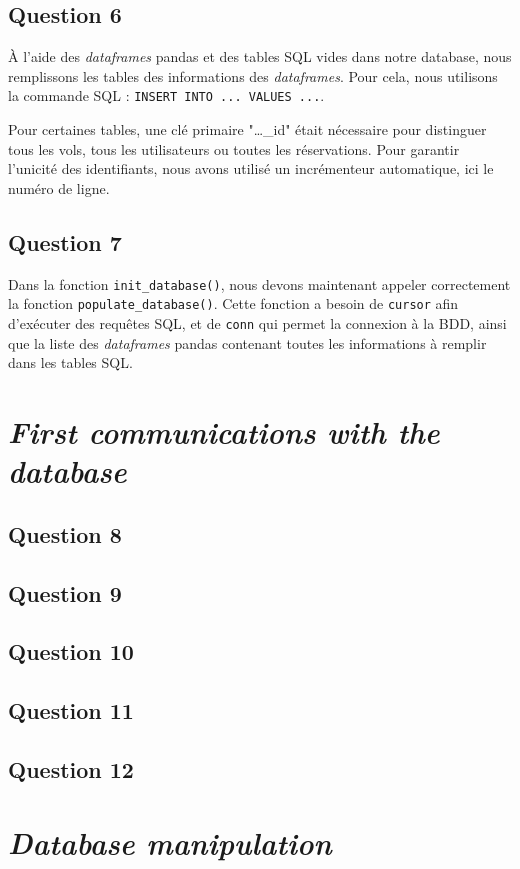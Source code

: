 \documentclass{ceri/sty/rapport}
\begin{document}
\subsection{Question 6}
À l'aide des \textit{dataframes} pandas et des tables SQL vides dans notre database, nous remplissons les tables des informations des \textit{dataframes}.
Pour cela, nous utilisons la commande SQL : \texttt{INSERT INTO ... VALUES ...}.

Pour certaines tables, une clé primaire "…\_id" était nécessaire pour distinguer tous les vols, tous les utilisateurs ou toutes les réservations.
Pour garantir l'unicité des identifiants, nous avons utilisé un incrémenteur automatique, ici le numéro de ligne.

\subsection{Question 7}
Dans la fonction \texttt{init\_database()}, nous devons maintenant appeler correctement la fonction \texttt{populate\_database()}.
Cette fonction a besoin de \texttt{cursor} afin d'exécuter des requêtes SQL, et de \texttt{conn} qui permet la connexion à la BDD, ainsi que la liste des \textit{dataframes} pandas contenant toutes les informations à remplir dans les tables SQL.

\section{\textit{First communications with the database}}
\subsection{Question 8}
\subsection{Question 9}
\subsection{Question 10}
\subsection{Question 11}
\subsection{Question 12}

\section{\textit{Database manipulation}}
\end{document}
